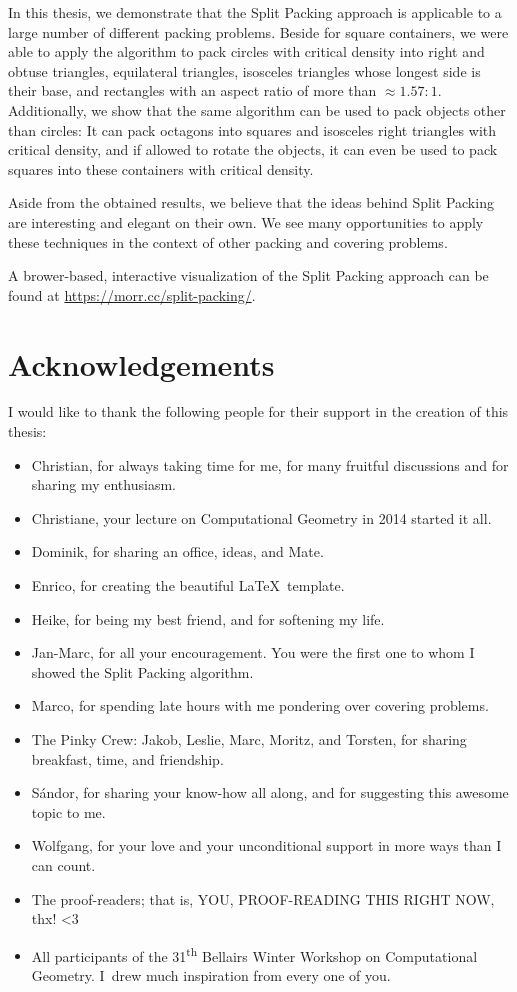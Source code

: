 \documentclass[a4paper,style=print,bibliography=totoc,nexus,lnum,extramargin]{tubsbook}
\begin{document}
In this thesis, we demonstrate that the Split Packing approach is applicable to a large number of different packing problems.
Beside for square containers, we were able to apply the algorithm to pack circles with critical density into
right and obtuse triangles,
equilateral triangles,
isosceles triangles whose longest side is their base,
and rectangles with an aspect ratio of more than $\approx \! 1.57:1$.
Additionally, we show that the same algorithm can be used to pack objects other than circles: It can pack octagons into squares and isosceles right triangles with critical density, and if allowed to rotate the objects, it can even be used to pack squares into these containers with critical density.

Aside from the obtained results, we believe that the ideas behind Split Packing are interesting and elegant on their own. We see many opportunities to apply these techniques in the context of other packing and covering problems.

A brower-based, interactive visualization of the Split Packing approach can be found at \url{https://morr.cc/split-packing/}.

\cleardoublepage

\section*{Acknowledgements}

I would like to thank the following people for their support in the creation of this thesis:

\begin{itemize}
    \item Christian, for always taking time for me, for many fruitful discussions and for sharing my enthusiasm.
    \item Christiane, your lecture on Computational Geometry in 2014 started it all.
    \item Dominik, for sharing an office, ideas, and Mate.
    \item Enrico, for creating the beautiful \LaTeX\ template.
    \item Heike, for being my best friend, and for softening my life.
    \item Jan-Marc, for all your encouragement. You were the first one to whom I showed the Split Packing algorithm.
    \item Marco, for spending late hours with me pondering over covering problems.
    \item The Pinky Crew: Jakob, Leslie, Marc, Moritz, and Torsten, for sharing breakfast, time, and friendship.
    \item Sándor, for sharing your know-how all along, and for suggesting this awesome topic to me.
    \item Wolfgang, for your love and your unconditional support in more ways than I can count.
    \item The proof-readers; that is, YOU, PROOF-READING THIS RIGHT NOW, thx! <3
    \item All participants of the 31\textsuperscript{th} Bellairs Winter Workshop on Computational Geometry. I~drew much inspiration from every one of you.
\end{itemize}
\end{document}
